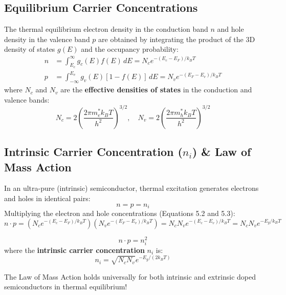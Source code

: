\subsection{Equilibrium Carrier Concentrations}
The thermal equilibrium electron density in the conduction band $n$ and hole density in the valence band $p$ are obtained by integrating the product of the 3D density of states $g(E)$ and the occupancy probability:
\begin{align}
    n &= \int_{E_c}^{\infty} g_c(E) f(E)\,dE = N_c e^{-(E_c - E_F)/k_B T} \\
    p &= \int_{-\infty}^{E_v} g_v(E) [1 - f(E)]\,dE = N_v e^{-(E_F - E_v)/k_B T}
\end{align}
where $N_c$ and $N_v$ are the \textbf{effective densities of states} in the conduction and valence bands:
\begin{equation}
    N_c = 2\left(\frac{2\pi m_e^* k_B T}{h^2}\right)^{3/2}, \quad N_v = 2\left(\frac{2\pi m_h^* k_B T}{h^2}\right)^{3/2}
\end{equation}

\subsection{Intrinsic Carrier Concentration (\texorpdfstring{$n_i$}{ni}) \& Law of Mass Action}
In an ultra-pure (intrinsic) semiconductor, thermal excitation generates electrons and holes in identical pairs:
\begin{equation}
    n = p = n_i
\end{equation}
Multiplying the electron and hole concentrations (Equations 5.2 and 5.3):
\begin{equation}
    n \cdot p = \left( N_c e^{-(E_c - E_F)/k_B T} \right) \left( N_v e^{-(E_F - E_v)/k_B T} \right) = N_c N_v e^{-(E_c - E_v)/k_B T} = N_c N_v e^{-E_g / k_B T}
\end{equation}

\begin{keyequation}
\begin{equation}
    n \cdot p = n_i^2
\end{equation}
where the \textbf{intrinsic carrier concentration} $n_i$ is:
\begin{equation}
    n_i = \sqrt{N_c N_v} e^{-E_g / (2 k_B T)}
\end{equation}
\end{keyequation}
The Law of Mass Action holds universally for both intrinsic and extrinsic doped semiconductors in thermal equilibrium!

